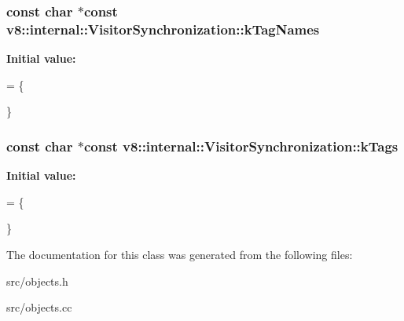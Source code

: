 \subsubsection[{k\+Tag\+Names}]{\setlength{\rightskip}{0pt plus 5cm}const char $\ast$const v8\+::internal\+::\+Visitor\+Synchronization\+::k\+Tag\+Names\hspace{0.3cm}{\ttfamily [static]}}\label{classv8_1_1internal_1_1_visitor_synchronization_a3869a214fa04d932977fabc5391add87}
{\bfseries Initial value\+:}
\begin{DoxyCode}
= \{

\}
\end{DoxyCode}
\hypertarget{classv8_1_1internal_1_1_visitor_synchronization_a4ceb9fa65252b22e09054e592e5136c5}{}
\subsubsection[{k\+Tags}]{\setlength{\rightskip}{0pt plus 5cm}const char $\ast$const v8\+::internal\+::\+Visitor\+Synchronization\+::k\+Tags\hspace{0.3cm}{\ttfamily [static]}}\label{classv8_1_1internal_1_1_visitor_synchronization_a4ceb9fa65252b22e09054e592e5136c5}
{\bfseries Initial value\+:}
\begin{DoxyCode}
= \{

\}
\end{DoxyCode}


The documentation for this class was generated from the following files\+:\begin{DoxyCompactItemize}
\item 
src/objects.\+h\item 
src/objects.\+cc\end{DoxyCompactItemize}
